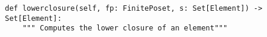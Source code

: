 \begin{verbatim}
def lowerclosure(self, fp: FinitePoset, s: Set[Element]) -> Set[Element]:
    """ Computes the lower closure of an element"""
\end{verbatim}
